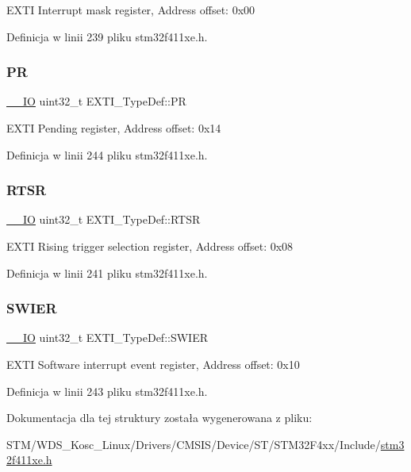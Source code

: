 E\+X\+TI Interrupt mask register, Address offset\+: 0x00 

Definicja w linii 239 pliku stm32f411xe.\+h.

\mbox{\label{struct_e_x_t_i___type_def_a133294b87dbe6a01e8d9584338abc39a}} 
\subsubsection{\texorpdfstring{PR}{PR}}
{\footnotesize\ttfamily \hyperlink{core__sc300_8h_aec43007d9998a0a0e01faede4133d6be}{\+\_\+\+\_\+\+IO} uint32\+\_\+t E\+X\+T\+I\+\_\+\+Type\+Def\+::\+PR}

E\+X\+TI Pending register, Address offset\+: 0x14 

Definicja w linii 244 pliku stm32f411xe.\+h.

\mbox{\label{struct_e_x_t_i___type_def_ac019d211d8c880b327a1b90a06cc0675}} 
\subsubsection{\texorpdfstring{R\+T\+SR}{RTSR}}
{\footnotesize\ttfamily \hyperlink{core__sc300_8h_aec43007d9998a0a0e01faede4133d6be}{\+\_\+\+\_\+\+IO} uint32\+\_\+t E\+X\+T\+I\+\_\+\+Type\+Def\+::\+R\+T\+SR}

E\+X\+TI Rising trigger selection register, Address offset\+: 0x08 

Definicja w linii 241 pliku stm32f411xe.\+h.

\mbox{\label{struct_e_x_t_i___type_def_a5c1f538e64ee90918cd158b808f5d4de}} 
\subsubsection{\texorpdfstring{S\+W\+I\+ER}{SWIER}}
{\footnotesize\ttfamily \hyperlink{core__sc300_8h_aec43007d9998a0a0e01faede4133d6be}{\+\_\+\+\_\+\+IO} uint32\+\_\+t E\+X\+T\+I\+\_\+\+Type\+Def\+::\+S\+W\+I\+ER}

E\+X\+TI Software interrupt event register, Address offset\+: 0x10 

Definicja w linii 243 pliku stm32f411xe.\+h.



Dokumentacja dla tej struktury została wygenerowana z pliku\+:\begin{DoxyCompactItemize}
\item 
S\+T\+M/\+W\+D\+S\+\_\+\+Kosc\+\_\+\+Linux/\+Drivers/\+C\+M\+S\+I\+S/\+Device/\+S\+T/\+S\+T\+M32\+F4xx/\+Include/\hyperlink{stm32f411xe_8h}{stm32f411xe.\+h}\end{DoxyCompactItemize}
